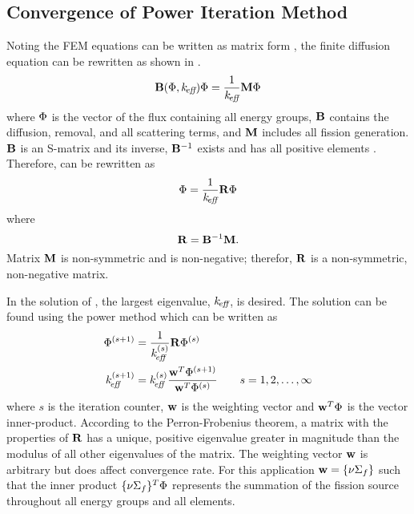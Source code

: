   \subsection{Convergence of Power Iteration Method}
    Noting the FEM equations can be written as matrix form
    , the finite diffusion equation can be rewritten as
    shown in \cite{gehinThesis}.
    \begin{equation}
      \label{eq:gehin_notation}
      \mathbf{B}(\Phi,k_{\!\mbox{\scriptsize \em eff}}) \Phi = \frac{1}{k_{\!\mbox{\scriptsize \em eff}}} \mathbf{M} \Phi
    \end{equation}
    where $\Phi$ is the vector of the flux containing all energy groups, $\mathbf{B}$
    contains the diffusion, removal, and all scattering terms, and $\mathbf{M}$ 
    includes all fission generation. $\mathbf{B}$ is an S-matrix and its inverse, 
    $\mathbf{B}^{-1}$ exists and has all positive elements \cite{nakamura}. Therefore,
     can be rewritten as
    \begin{equation}
      \label{eq:gehin_solution}
      \Phi = \frac{1}{k_{\!\mbox{\scriptsize \em eff}}} \mathbf{R} \Phi
    \end{equation}
    where
    \begin{equation}
      \label{eq:gehin_r}
      \mathbf{R} = \mathbf{B}^{-1} \mathbf{M}.
    \end{equation}
    Matrix $\mathbf{M}$ is non-symmetric and is non-negative; therefor, $\mathbf{R}$ is a
    non-symmetric, non-negative matrix.

    In the solution of , the largest eigenvalue,
    $k_{\!\mbox{\scriptsize \em eff}}$, is desired. The solution can be found using the power method which 
    can be written as 
    \begin{align}
      \label{eq:power_iteration_phi}
      \Phi^{(s+1)} &= \frac{1}{k_{\!\mbox{\scriptsize \em eff}}^{(s)}} \mathbf{R} \Phi^{(s)} \\
      \label{eq:power_iteration_eigenvalue}
      k_{\!\mbox{\scriptsize \em eff}}^{(s+1)} &= k_{\!\mbox{\scriptsize \em eff}}^{(s)} \frac{\mathbf{w}^{T} \Phi^{(s+1)}}
        {\mathbf{w}^{T} \Phi^{(s)}} \qquad s = 1,2,\ldots,\infty
    \end{align}
    where $s$ is the iteration counter, $\mathbf{w}$ is the weighting vector and 
    $\mathbf{w}^{T} \Phi$ is the vector inner-product. According to the 
    Perron-Frobenius theorem, a matrix with the properties of $\mathbf{R}$ has a 
    unique, positive eigenvalue greater in magnitude than the modulus of all 
    other eigenvalues of the matrix. The weighting vector $\mathbf{w}$ is arbitrary 
    but does affect convergence rate. For this application 
    $\mathbf{w} = \{\nu \Sigma_f\}$ such that the inner product 
    $\{\nu \Sigma_f\}^T \Phi$ represents the summation of the fission source 
    throughout all energy groups and all elements. 
    
